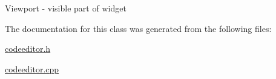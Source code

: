 Viewport -\/ visible part of widget 

The documentation for this class was generated from the following files\+:\begin{DoxyCompactItemize}
\item 
\hyperlink{codeeditor_8h}{codeeditor.\+h}\item 
\hyperlink{codeeditor_8cpp}{codeeditor.\+cpp}\end{DoxyCompactItemize}
